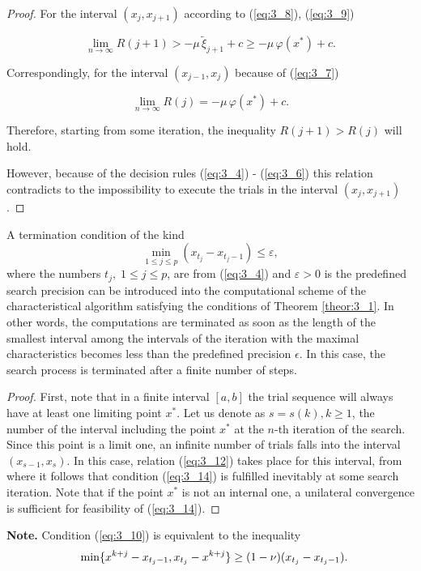 \begin{proof}
	For the interval $(x_{j} ,x_{j+1} )$ according to  (\ref{eq:3_8}),  (\ref{eq:3_9})

	\begin{equation*}
	\mathop{\lim }\limits_{n\to \infty } R(j+1)>-\mu \, \tilde{\xi }_{j+1} +c\ge -\mu \, \varphi (x^{*} )+c.
	\end{equation*}
	
	Correspondingly, for the interval $(x_{j-1} ,x_{j} )$ because of  (\ref{eq:3_7}) 
	
	\begin{equation}
	\label{eq:3_13}
	\mathop{\lim }\limits_{n\to \infty } R(j)=-\mu \, \varphi (x^{*} )+c.
	\end{equation}
	
	Therefore, starting from some iteration, the inequality $R(j+1)>R(j)$ will hold.
	
	However, because of the decision rules  (\ref{eq:3_4}) - (\ref{eq:3_6}) this relation contradicts to the impossibility to execute the trials in the interval $(x_{j} ,x_{j+1} )$. 
	\end{proof}
	\begin{corollary} 
	A termination condition of the kind 
		\begin{equation}
	\label{eq:3_14}
	\mathop{\min }\limits_{1\le j\le p} (x_{t_{j} } -x_{t_{j} -1} )\le \varepsilon ,
	\end{equation}
	where the numbers $t_{j} ,\; 1\le j\le p$, are from  (\ref{eq:3_4}) and $\varepsilon >0$ is the predefined search precision can be introduced into the computational scheme of the characteristical algorithm satisfying the conditions of Theorem \ref{theor:3_1}. In other words, the computations are terminated as soon as the length of the smallest interval among the intervals of the iteration with the maximal characteristics becomes less than the predefined precision $\epsilon$. In this case, the search process is terminated after a finite number of steps. 	
	\end{corollary}
	\begin{proof} First, note that in a finite interval $[a,b]$ the trial sequence will always have at least one limiting point $x^{*} $. Let us denote as $s=s(k),k\ge 1$, the number of the interval including the point $x^{*} $ at the $n$-th iteration of the search. Since this point is a limit one, an infinite number of trials falls into the interval $(x_{s-1} ,x_{s} )$. In this case, relation  (\ref{eq:3_12}) takes place for this interval, from  where it follows that condition  (\ref{eq:3_14}) is fulfilled inevitably at some search iteration. Note that if the point $x^{*} $ is not an internal one, a unilateral convergence is sufficient for feasibility of  (\ref{eq:3_14}).
	\end{proof}
	\textbf{Note.} Condition  (\ref{eq:3_10}) is equivalent to the inequality
	\begin{equation*}
	{\rm \; \; }\min \{ x^{k+j} -x_{t_{j} -1} ,x_{t_{j} } -x^{k+j} \} \ge (1-\nu )(x_{t_{j} } -x_{t_{j} -1} ).
	\end{equation*}
	
